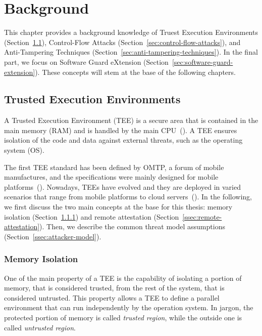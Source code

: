 \chapter{Background}
\label{chp:background} 

This chapter provides a background knowledge of Truest Execution Environments 
(Section~\ref{sec:trusted-execution-enviroments}), Control-Flow Attacks 
(Section~\ref{sec:control-flow-attacks}), and Anti-Tampering Techniques 
(Section~\ref{sec:anti-tampering-techniques}).
In the final part, we focus on Software Guard eXtension 
(Section~\ref{sec:software-guard-extension}).
These concepts will stem at the base of the following chapters.

\section{Trusted Execution Environments}
\label{sec:trusted-execution-enviroments}

A Trusted Execution Environment (TEE) is a secure area that is contained in the 
main memory (RAM) and is handled by the main CPU~(\cite{Sabt2015TrustedEE}).
A TEE ensures isolation of the code and data against external threats, such as 
the operating system (OS).

The first TEE standard has been defined by OMTP, a forum of mobile 
manufactures, and the specifications were mainly designed for mobile 
platforms~(\cite{omtp}).
Nowadays, TEEs have evolved and they are deployed in varied scenarios that 
range from mobile platforms to cloud servers~(\cite{schuster2015vc3,sgxtor}).
In the following, we first discuss the two main concepts at the base for this 
thesis: memory isolation (Section~\ref{ssec:memory-isolation}) and remote 
attestation (Section~\ref{ssec:remote-attestation}).
Then, we describe the common threat model assumptions 
(Section~\ref{ssec:attacker-model}).

\subsection{Memory Isolation}
\label{ssec:memory-isolation}

One of the main property of a TEE is the capability of isolating a portion of 
memory, that is considered trusted, from the rest of the system, that  is 
considered untrusted.
This property allows a TEE to define a parallel environment that can run 
independently by the operation system.
In jargon, the protected portion of memory is called \emph{trusted 
region}, while the outside one is called \emph{untrusted region}.

